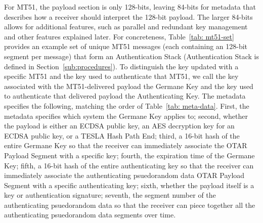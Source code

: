 \documentclass[letterpaper,times]{IONconf/IONconf}
\begin{document}
		For MT51, the payload section is only 128-bits, leaving 84-bits for metadata that describes how a receiver should interpret the 128-bit payload.
		The larger 84-bits allows for additional features, such as parallel and redundant key management and other features explained later.
		For concreteness, Table~\ref{tab: mt51-set} provides an example set of unique MT51 messages (each containing an 128-bit segment per message) that form an Authentication Stack (Authentication Stack is defined in Section~\ref{sub:procedures}).
		To distinguish the key updated with a specific MT51 and the key used to authenticate that MT51, we call the key associated with the MT51-delivered payload the Germane Key and the key used to authenticate that delivered payload the Authenticating Key.
		The metadata specifies the following, matching the order of Table~\ref{tab: meta-data}.
		First, the metadata specifies which system the Germane Key applies to;
		second, whether the payload is either an ECDSA public key, an AES decryption key for an ECDSA public key, or a TESLA Hash Path End;
		third, a 16-bit hash of the entire Germane Key so that the receiver can immediately associate the OTAR Payload Segment with a specific key;
		fourth, the expiration time of the Germane Key;
		fifth, a 16-bit hash of the entire authenticating key so that the receiver can immediately associate the authenticating psuedorandom data OTAR Payload Segment with a specific authenticating key;
		sixth, whether the payload itself is a key or authentication signature;
		seventh, the segment number of the authenticating psuedorandom data so that the receiver can piece together all the authenticating psuedorandom data segments over time.
\end{document}
